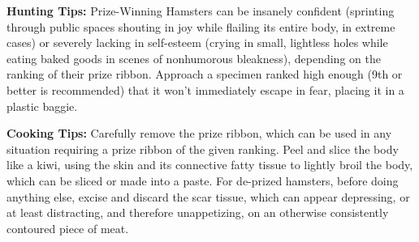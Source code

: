 \documentclass[10pt,twoside,openright]{memoir}
\begin{document}
\noindent
\textbf{Hunting Tips:} Prize-Winning Hamsters can be insanely confident (sprinting
through public spaces shouting in joy while flailing its entire body, in extreme
cases) or severely lacking in self-esteem (crying in small, lightless holes
while eating baked goods in scenes of nonhumorous bleakness), depending on the
ranking of their prize ribbon. Approach a specimen ranked high enough (9th or
better is recommended) that it won't immediately escape in fear, placing it
in a plastic baggie.

\vspace{1em}
\noindent
\textbf{Cooking Tips:} Carefully remove the prize ribbon, which can be used in any
situation requiring a prize ribbon of the given ranking. Peel and slice the body
like a kiwi, using the skin and its connective fatty tissue to lightly broil the
body, which can be sliced or made into a paste. For de-prized hamsters, before
doing anything else, excise and discard the scar tissue, which can appear
depressing, or at least distracting, and therefore unappetizing, on an otherwise
consistently contoured piece of meat.
\end{document}
